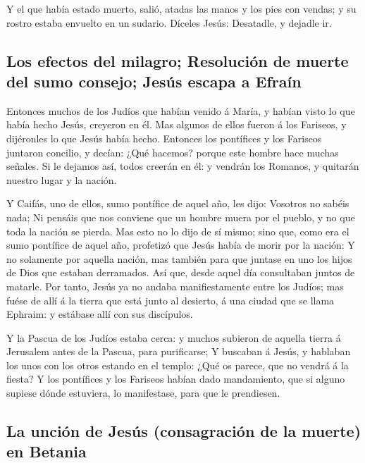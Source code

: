  Y el que había estado muerto, salió, atadas las manos y
los pies con vendas; y su rostro estaba envuelto en un sudario. Díceles
Jesús: Desatadle, y dejadle ir.

\hypertarget{los-efectos-del-milagro-resoluciuxf3n-de-muerte-del-sumo-consejo-jesuxfas-escapa-a-efrauxedn}{%
\subsection{Los efectos del milagro; Resolución de muerte del sumo
consejo; Jesús escapa a
Efraín}\label{los-efectos-del-milagro-resoluciuxf3n-de-muerte-del-sumo-consejo-jesuxfas-escapa-a-efrauxedn}}

 Entonces muchos de los Judíos que habían venido á María, y
habían visto lo que había hecho Jesús, creyeron en él.  Mas
algunos de ellos fueron á los Fariseos, y dijéronles lo que Jesús había
hecho.  Entonces los pontífices y los Fariseos juntaron
concilio, y decían: ¿Qué hacemos? porque este hombre hace muchas
señales.  Si le dejamos así, todos creerán en él: y vendrán
los Romanos, y quitarán nuestro lugar y la nación.

 Y Caifás, uno de ellos, sumo pontífice de aquel año, les
dijo: Vosotros no sabéis nada;  Ni pensáis que nos conviene
que un hombre muera por el pueblo, y no que toda la nación se pierda.
 Mas esto no lo dijo de sí mismo; sino que, como era el
sumo pontífice de aquel año, profetizó que Jesús había de morir por la
nación:  Y no solamente por aquella nación, mas también
para que juntase en uno los hijos de Dios que estaban derramados.
 Así que, desde aquel día consultaban juntos de matarle.
 Por tanto, Jesús ya no andaba manifiestamente entre los
Judíos; mas fuése de allí á la tierra que está junto al desierto, á una
ciudad que se llama Ephraim: y estábase allí con sus discípulos.

 Y la Pascua de los Judíos estaba cerca: y muchos subieron
de aquella tierra á Jerusalem antes de la Pascua, para purificarse;
 Y buscaban á Jesús, y hablaban los unos con los otros
estando en el templo: ¿Qué os parece, que no vendrá á la fiesta?
 Y los pontífices y los Fariseos habían dado mandamiento,
que si alguno supiese dónde estuviera, lo manifestase, para que le
prendiesen.

\hypertarget{la-unciuxf3n-de-jesuxfas-consagraciuxf3n-de-la-muerte-en-betania}{%
\subsection{La unción de Jesús (consagración de la muerte) en
Betania}\label{la-unciuxf3n-de-jesuxfas-consagraciuxf3n-de-la-muerte-en-betania}}


